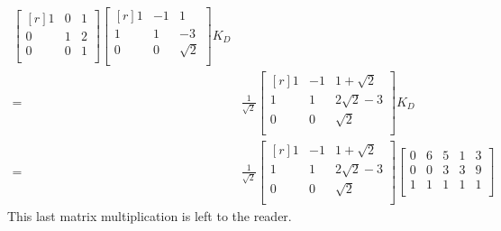 \documentclass[../main.tex]{subfiles}
\begin{document}
\begin{enumerate}[a)]
\begin{align*}
\begin{bmatrix*}[r]
				1 & 0 & 1 \\
				0 & 1 & 2 \\
				0 & 0 & 1 \\
			\end{bmatrix*}
			\begin{bmatrix*}[r]
				1 & -1 & 1 \\
				1 & 1 & -3 \\
				0 & 0 & \sqrt{2} \\
			\end{bmatrix*}
			K_D
			\\=&
			\frac{1}{\sqrt{2}}
			\begin{bmatrix*}[r]
				1 & -1 & 1 + \sqrt{2} \\
				1 & 1 & 2\sqrt{2} - 3 \\
				0 & 0 & \sqrt{2} \\
			\end{bmatrix*}
			K_D
			\\=&
			\frac{1}{\sqrt{2}}
			\begin{bmatrix*}[r]
				1 & -1 & 1 + \sqrt{2} \\
				1 & 1 & 2\sqrt{2} - 3 \\
				0 & 0 & \sqrt{2} \\
			\end{bmatrix*}
			\begin{bmatrix}
				0 & 6 & 5 & 1 & 3 \\
				0 & 0 & 3 & 3 & 9 \\
				1 & 1 & 1 & 1 & 1 \\
			\end{bmatrix}
		\end{align*}
		This last matrix multiplication is left to the reader.
\end{enumerate}
\end{document}
